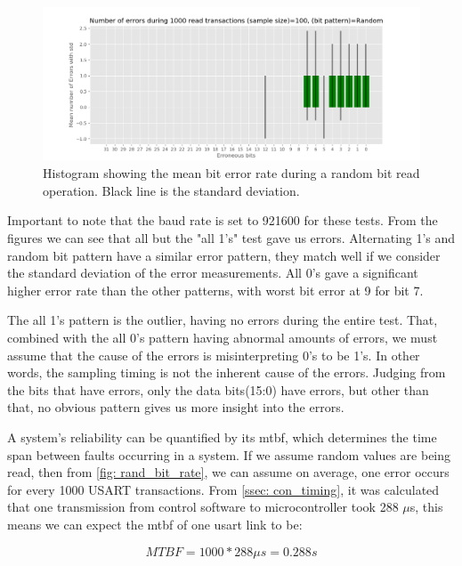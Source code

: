 \documentclass[main.tex]{subfiles}
\begin{document}
\begin{figure}[!ht]
    \centering
    \includegraphics[width=18cm]{images/error_rate_random.png}
    \caption{Histogram showing the mean bit error rate during a random bit read operation. Black line is the standard deviation.}
    \label{fig: rand_bit_rate}
\end{figure}
\FloatBarrier

Important to note that the baud rate is set to 921600 for these tests. From the figures we can see that all but the "all 1's" test gave us errors. Alternating 1's and random bit pattern have a similar error pattern, they match well if we consider the standard deviation of the error measurements. All 0's gave a significant higher error rate than the other patterns, with worst bit error at 9 for bit 7.



The all 1's pattern is the outlier, having no errors during the entire test. That, combined with the all 0's pattern having abnormal amounts of errors, we must assume that the cause of the errors is misinterpreting 0's to be 1's. In other words, the sampling timing is not the inherent cause of the errors. Judging from the bits that have errors, only the data bits(15:0) have errors, but other than that, no obvious pattern gives us more insight into the errors.

A system's reliability can be quantified by its \gls{mtbf}, which determines the time span between faults occurring in a system\cite{mtbf_intro}. If we assume random values are being read, then from \autoref{fig: rand_bit_rate}, we can assume on average, one error occurs for every 1000 USART transactions. From \autoref{ssec: con_timing}, it was calculated that one transmission from control software to microcontroller took 288 $\mu$s, this means we can expect the \gls{mtbf} of one \gls{usart} link to be:

\begin{equation} \label{eqn:single_mtbf}
MTBF = 1000*288\mu s = 0.288 s
\end{equation}
\end{document}
